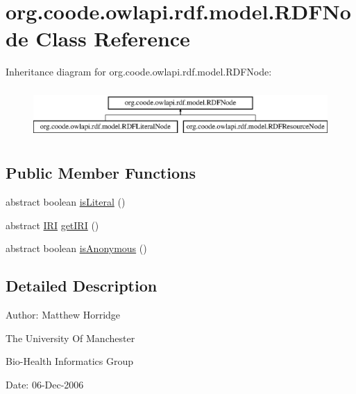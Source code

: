 \hypertarget{classorg_1_1coode_1_1owlapi_1_1rdf_1_1model_1_1_r_d_f_node}{\section{org.\-coode.\-owlapi.\-rdf.\-model.\-R\-D\-F\-Node Class Reference}
\label{classorg_1_1coode_1_1owlapi_1_1rdf_1_1model_1_1_r_d_f_node}
}
Inheritance diagram for org.\-coode.\-owlapi.\-rdf.\-model.\-R\-D\-F\-Node\-:\begin{figure}[H]
\begin{center}
\leavevmode
\includegraphics[height=1.944445cm]{classorg_1_1coode_1_1owlapi_1_1rdf_1_1model_1_1_r_d_f_node}
\end{center}
\end{figure}
\subsection*{Public Member Functions}
\begin{DoxyCompactItemize}
\item 
abstract boolean \hyperlink{classorg_1_1coode_1_1owlapi_1_1rdf_1_1model_1_1_r_d_f_node_acc84d2483ab6c0829fba71b449c56c38}{is\-Literal} ()
\item 
abstract \hyperlink{classorg_1_1semanticweb_1_1owlapi_1_1model_1_1_i_r_i}{I\-R\-I} \hyperlink{classorg_1_1coode_1_1owlapi_1_1rdf_1_1model_1_1_r_d_f_node_a908d4e6952226fb4a0693c31d55aabcc}{get\-I\-R\-I} ()
\item 
abstract boolean \hyperlink{classorg_1_1coode_1_1owlapi_1_1rdf_1_1model_1_1_r_d_f_node_a35c8342de82f53426a9cca449a877c15}{is\-Anonymous} ()
\end{DoxyCompactItemize}


\subsection{Detailed Description}
Author\-: Matthew Horridge\par
 The University Of Manchester\par
 Bio-\/\-Health Informatics Group\par
 Date\-: 06-\/\-Dec-\/2006\par
\par
 

